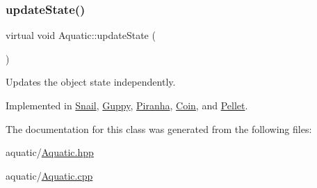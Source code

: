 \mbox{\label{class_aquatic_a51e44c95476d72a841fea667c6cbbedc}} 
\subsubsection{\texorpdfstring{update\+State()}{updateState()}}
{\footnotesize\ttfamily virtual void Aquatic\+::update\+State (\begin{DoxyParamCaption}{ }\end{DoxyParamCaption})\hspace{0.3cm}{\ttfamily [pure virtual]}}



Updates the object state independently. 



Implemented in \mbox{\hyperlink{class_snail_a46dbefb10308c29341d96423e853cb2b}{Snail}}, \mbox{\hyperlink{class_guppy_ac62ef7053d40430ad98c1d5a54699f9d}{Guppy}}, \mbox{\hyperlink{class_piranha_a851c302af9de1d6eaf727242e2912f62}{Piranha}}, \mbox{\hyperlink{class_coin_ac9d03cbd68f9ccb739895832f77d60a3}{Coin}}, and \mbox{\hyperlink{class_pellet_ab21f88899eba022e1693d911eba9dbfb}{Pellet}}.



The documentation for this class was generated from the following files\+:\begin{DoxyCompactItemize}
\item 
aquatic/\mbox{\hyperlink{_aquatic_8hpp}{Aquatic.\+hpp}}\item 
aquatic/\mbox{\hyperlink{_aquatic_8cpp}{Aquatic.\+cpp}}\end{DoxyCompactItemize}
